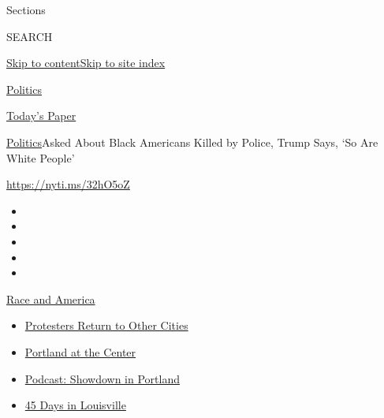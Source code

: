Sections

SEARCH

\protect\hyperlink{site-content}{Skip to
content}\protect\hyperlink{site-index}{Skip to site index}

\href{https://www.nytimes3xbfgragh.onion/section/politics}{Politics}

\href{https://myaccount.nytimes3xbfgragh.onion/auth/login?response_type=cookie\&client_id=vi}{}

\href{https://www.nytimes3xbfgragh.onion/section/todayspaper}{Today's
Paper}

\href{/section/politics}{Politics}\textbar{}Asked About Black Americans
Killed by Police, Trump Says, `So Are White People'

\url{https://nyti.ms/32hO5oZ}

\begin{itemize}
\item
\item
\item
\item
\item
\end{itemize}

\href{https://www.nytimes3xbfgragh.onion/news-event/george-floyd-protests-minneapolis-new-york-los-angeles?action=click\&pgtype=Article\&state=default\&region=TOP_BANNER\&context=storylines_menu}{Race
and America}

\begin{itemize}
\tightlist
\item
  \href{https://www.nytimes3xbfgragh.onion/2020/07/26/us/protests-portland-seattle-trump.html?action=click\&pgtype=Article\&state=default\&region=TOP_BANNER\&context=storylines_menu}{Protesters
  Return to Other Cities}
\item
  \href{https://www.nytimes3xbfgragh.onion/2020/07/24/us/portland-oregon-protests-white-race.html?action=click\&pgtype=Article\&state=default\&region=TOP_BANNER\&context=storylines_menu}{Portland
  at the Center}
\item
  \href{https://www.nytimes3xbfgragh.onion/2020/07/23/podcasts/the-daily/portland-protests.html?action=click\&pgtype=Article\&state=default\&region=TOP_BANNER\&context=storylines_menu}{Podcast:
  Showdown in Portland}
\item
  \href{https://www.nytimes3xbfgragh.onion/interactive/2020/07/16/us/black-lives-matter-protests-louisville-breonna-taylor.html?action=click\&pgtype=Article\&state=default\&region=TOP_BANNER\&context=storylines_menu}{45
  Days in Louisville}
\end{itemize}

